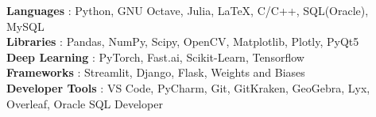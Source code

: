 \textbf
     {Languages}
     {: Python, GNU Octave, Julia, \LaTeX, C/C++, SQL(Oracle), MySQL} \\    
     
 \textbf
     {Libraries}
     {: Pandas, NumPy, Scipy, OpenCV, Matplotlib, Plotly, PyQt5} \\
     
 \textbf
     {Deep Learning}
     {: PyTorch, Fast.ai, Scikit-Learn, Tensorflow}\\
     
 \textbf
     {Frameworks}
     {: Streamlit, Django, Flask, Weights and Biases} \\
     
 \textbf
     {Developer Tools}
     {: VS Code, PyCharm, Git, GitKraken, GeoGebra, Lyx, Overleaf, Oracle SQL Developer } \\